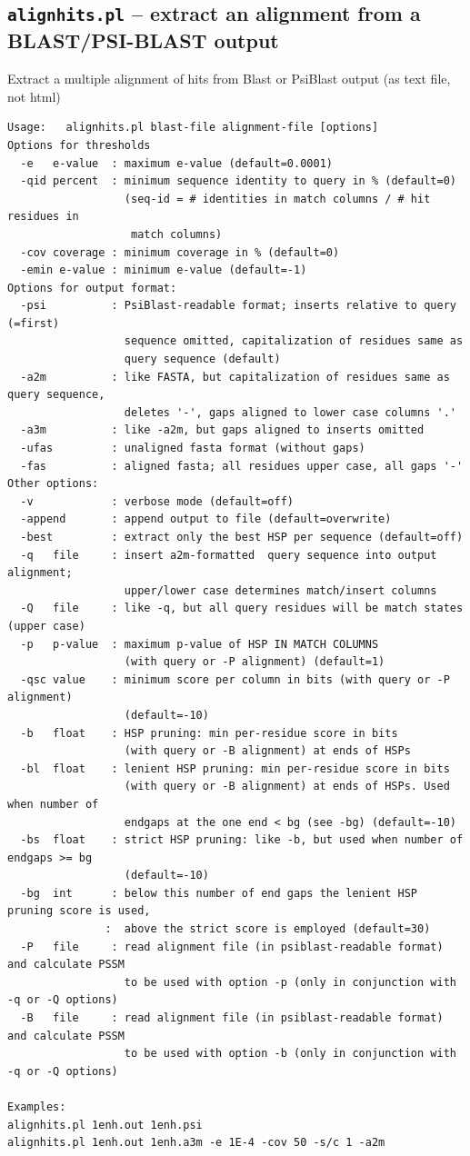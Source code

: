 \documentclass[11pt,a4paper]{article}
\begin{document}
\subsection{{\tt alignhits.pl} -- extract an alignment from a BLAST/PSI-BLAST output}

Extract a multiple alignment of hits from Blast or PsiBlast output (as text file, not html)

\small \begin{verbatim}
Usage:   alignhits.pl blast-file alignment-file [options]
Options for thresholds
  -e   e-value  : maximum e-value (default=0.0001)
  -qid percent  : minimum sequence identity to query in % (default=0) 
                  (seq-id = # identities in match columns / # hit residues in 
                   match columns)
  -cov coverage : minimum coverage in % (default=0) 
  -emin e-value : minimum e-value (default=-1)
Options for output format:
  -psi          : PsiBlast-readable format; inserts relative to query (=first) 
                  sequence omitted, capitalization of residues same as 
                  query sequence (default)
  -a2m          : like FASTA, but capitalization of residues same as query sequence,
                  deletes '-', gaps aligned to lower case columns '.'
  -a3m          : like -a2m, but gaps aligned to inserts omitted
  -ufas         : unaligned fasta format (without gaps)
  -fas          : aligned fasta; all residues upper case, all gaps '-'
Other options:
  -v            : verbose mode (default=off)
  -append       : append output to file (default=overwrite)
  -best         : extract only the best HSP per sequence (default=off)
  -q   file     : insert a2m-formatted  query sequence into output alignment;
                  upper/lower case determines match/insert columns
  -Q   file     : like -q, but all query residues will be match states (upper case)
  -p   p-value  : maximum p-value of HSP IN MATCH COLUMNS 
                  (with query or -P alignment) (default=1)
  -qsc value    : minimum score per column in bits (with query or -P alignment) 
                  (default=-10) 
  -b   float    : HSP pruning: min per-residue score in bits 
                  (with query or -B alignment) at ends of HSPs
  -bl  float    : lenient HSP pruning: min per-residue score in bits 
                  (with query or -B alignment) at ends of HSPs. Used when number of 
                  endgaps at the one end < bg (see -bg) (default=-10)
  -bs  float    : strict HSP pruning: like -b, but used when number of endgaps >= bg 
                  (default=-10)
  -bg  int      : below this number of end gaps the lenient HSP pruning score is used,
               :  above the strict score is employed (default=30)
  -P   file     : read alignment file (in psiblast-readable format) and calculate PSSM
                  to be used with option -p (only in conjunction with -q or -Q options)
  -B   file     : read alignment file (in psiblast-readable format) and calculate PSSM
                  to be used with option -b (only in conjunction with -q or -Q options)

Examples: 
alignhits.pl 1enh.out 1enh.psi
alignhits.pl 1enh.out 1enh.a3m -e 1E-4 -cov 50 -s/c 1 -a2m
\end{verbatim} \normalsize
\end{document}

